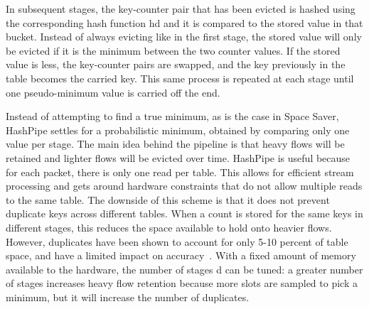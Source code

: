 In subsequent stages, the key-counter pair that has been evicted is hashed using the corresponding hash function hd and it is compared to the stored value in that bucket. Instead of always evicting like in the first stage, the stored value will only be evicted if it is the minimum between the two counter values. If the stored value is less, the key-counter pairs are swapped, and the key previously in the table becomes the carried key. This same process is repeated at each stage until one pseudo-minimum value is carried off the end.

Instead of attempting to find a true minimum, as is the case in Space Saver, HashPipe settles for a probabilistic minimum, obtained by comparing only one value per stage. The main idea behind the pipeline is that heavy flows will be retained and lighter flows will be evicted over time. HashPipe is useful because for each packet, there is only one read per table. This allows for efficient stream processing and gets around hardware constraints that do not allow multiple reads to the same table. The downside of this scheme is that it does not prevent duplicate keys across different tables. When a count is stored for the same keys in different stages, this reduces the space available to hold onto heavier flows. However, duplicates have been shown to account for only 5-10 percent of table space, and have a limited impact on accuracy~\cite{hashpipe}. With a fixed amount of memory available to the hardware, the number of stages d can be tuned: a greater number of stages increases heavy flow retention because more slots are sampled to pick a minimum, but it will increase the number of duplicates.